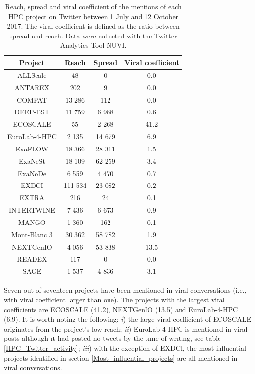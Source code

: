 \begin{table}[t]
 \begin{center}
 {\scriptsize
  \begin{tabular}{cccc}
   \hline 
   \hline
   Project & Reach & Spread & Viral coefficient \\ 
   \hline
   \hline
   ALLScale & 48 & 0 & 0.0 \\
   ANTAREX & 202 & 9 & 0.0 \\
   COMPAT & 13 286 & 112 & 0.0 \\
   DEEP-EST & 11 759 & 6 988 & 0.6 \\
   ECOSCALE & 55 & 2 268 & 41.2 \\
   EuroLab-4-HPC & 2 135 & 14 679 & 6.9 \\
   ExaFLOW & 18 366 & 28 311 & 1.5 \\
   ExaNeSt & 18 109 & 62 259 & 3.4  \\
   ExaNoDe & 6 559 & 4 470 & 0.7 \\
   EXDCI & 111 534 & 23 082 & 0.2 \\
   EXTRA & 216 & 24 & 0.1 \\
   INTERTWINE & 7 436 & 6 673 & 0.9 \\
   MANGO & 1 360 & 162 & 0.1 \\
   Mont-Blanc 3 & 30 362 & 58 782 & 1.9 \\
   NEXTGenIO & 4 056 & 53 838 & 13.5 \\
   READEX & 117 & 0 & 0.0 \\
   SAGE & 1 537 & 4 836 & 3.1 \\ 
   \hline
   \hline
  \end{tabular}
 } 
 \end{center} 
 \caption{Reach, spread and viral coefficient of the mentions of each HPC project on Twitter between 1 July and 12 October 2017. The viral coefficient is defined as the ratio between spread and reach. Data were collected with the Twitter Analytics Tool NUVI.}
\label{HPC_viral_coefficients} 
\end{table}

Seven out of seventeen projects have been mentioned in viral conversations (i.e., with viral coefficient larger than one). The projects with the largest viral coefficients are ECOSCALE (41.2), NEXTGenIO (13.5) and EuroLab-4-HPC (6.9). It is worth noting the following: \textit{i}) the large viral coefficient of ECOSCALE originates from the project's low reach; \textit{ii}) EuroLab-4-HPC is mentioned in viral posts although it had posted no tweets by the time of writing, see table \ref{HPC_Twitter_activity}; \textit{iii}) with the exception of EXDCI, the most influential projects identified in section \ref{Most_influential_projects} are all mentioned in viral conversations.

